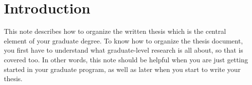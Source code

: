 %
%
%
%
\chapter{Introduction} \label{chap:introduction}
This note describes how to organize the written thesis which is the central element of your graduate degree. To know how to organize the thesis document, you first have to understand what graduate-level research is all about, so that is covered too. In other words, this note should be helpful when you are just getting started in your graduate program, as well as later when you start to write your thesis. 
